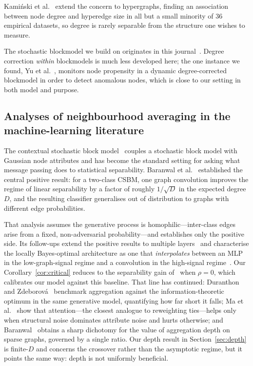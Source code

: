 \documentclass[../elsevier.tex]{subfiles}
\begin{document}
Kami\'nski et al.~\citeyearpar{kaminski2026relationships} extend the concern to
hypergraphs, finding an association between node degree and hyperedge size in all but a
small minority of $36$ empirical datasets, so degree is rarely separable from the
structure one wishes to measure.

The stochastic blockmodel we build on originates in this
journal~\citep{holland1983stochastic}. Degree correction \emph{within} blockmodels is
much less developed here; the one instance we found, Yu et
al.~\citeyearpar{yu2018detecting}, monitors node propensity in a dynamic degree-corrected
blockmodel in order to detect anomalous nodes, which is close to our setting in both
model and purpose.

\subsection{Analyses of neighbourhood averaging in the machine-learning literature}


The contextual stochastic block model~\citep{deshpande2018contextual} couples a
stochastic block model with Gaussian node attributes and has become the standard
setting for asking what message passing does to statistical separability. Baranwal
et al.~\citeyearpar{baranwal2021graph} established the central positive result: for a
two-class CSBM, one graph convolution improves the regime of linear separability by
a factor of roughly $1/\sqrt{D}$ in the expected degree $D$, and the resulting
classifier generalises out of distribution to graphs with different edge
probabilities.

That analysis assumes the generative process is homophilic---inter-class edges arise
from a fixed, non-adversarial probability---and establishes only the positive side.
Its follow-ups extend the positive results to multiple
layers~\citep{baranwal2023effects} and characterise the locally Bayes-optimal
architecture as one that \emph{interpolates} between an MLP in the low-graph-signal
regime and a convolution in the high-signal regime~\citep{baranwal2023optimality}.
Our Corollary~\ref{cor:critical} reduces to the separability gain
of~\citet{baranwal2021graph} when $\rho = 0$, which calibrates our model against this
baseline. That line has continued: Duranthon and
Zdeborov\'a~\citeyearpar{duranthon2025statistical} benchmark aggregation against the
information-theoretic optimum in the same generative model, quantifying how far short it
falls; Ma et al.~\citeyearpar{ma2025attention} show that attention---the closest
analogue to reweighting ties---helps only when structural noise dominates attribute
noise and hurts otherwise; and Baranwal~\citeyearpar{baranwal2026depth} obtains a sharp
dichotomy for the value of aggregation depth on sparse graphs, governed by a single
ratio. Our depth result in Section~\ref{sec:depth} is finite-$D$ and concerns the
crossover rather than the asymptotic regime, but it points the same way: depth is not
uniformly beneficial.
\end{document}
